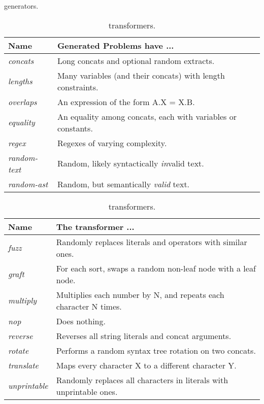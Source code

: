 \begin{table}[t]
    \centering
    \caption{\generator{} generators.}
    \label{tbl:generators}
    \begin{tabular}{|l|l|}
        \hline
        \textbf{Name}        & \textbf{Generated Problems have ...} \\ \hline
        \textit{concats}     & Long concats and optional random extracts. \\ \hline
        \textit{lengths}     & Many variables (and their concats) with length constraints. \\ \hline
        \textit{overlaps}    & An expression of the form A.X = X.B. \\ \hline
        \textit{equality}    & An equality among concats, each with variables or constants. \\ \hline
        \textit{regex}       & Regexes of varying complexity. \\ \hline
        \textit{random-text} & Random, likely syntactically \textit{in}valid text. \\ \hline
        \textit{random-ast}  & Random, but semantically \textit{valid} text. \\ \hline
    \end{tabular}
    \caption{\transformer{} transformers.}
    \label{tbl:transformers}
    \begin{tabular}{|l|l|}
        \hline
        \textbf{Name}        & \textbf{The transformer ...} \\ \hline
        \textit{fuzz}        & Randomly replaces literals and operators with similar ones. \\ \hline
        \textit{graft}       & For each sort, swaps a random non-leaf node with a leaf node. \\ \hline
        \textit{multiply}    & Multiplies each number by N, and repeats each character N times. \\ \hline
        \textit{nop}         & Does nothing. \\ \hline
        \textit{reverse}     & Reverses all string literals and concat arguments. \\ \hline
        \textit{rotate}      & Performs a random syntax tree rotation on two concats. \\ \hline
        \textit{translate}   & Maps every character X to a different character Y. \\ \hline
        \textit{unprintable} & Randomly replaces all characters in literals with unprintable ones. \\ \hline
    \end{tabular}
\end{table}

